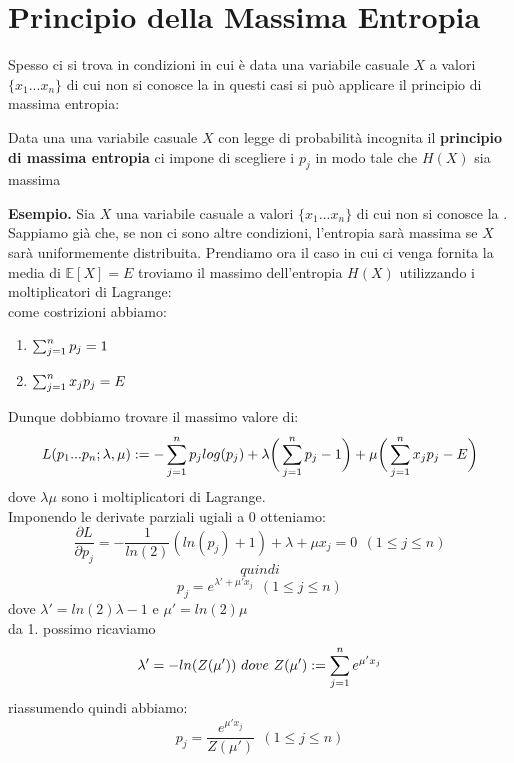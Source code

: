 \section{Principio della Massima Entropia}
\label{sec:maxEntropia}

Spesso ci si trova in condizioni in cui è data una variabile casuale $X$ a valori $\{ x_1...x_n \}$ di cui non si conosce la \lep  in questi casi si può applicare il principio di massima entropia:\\
\begin{defi}
Data una una variabile casuale $X$ con legge di probabilità \lep  incognita il \textbf{principio di massima entropia} ci impone di scegliere i $p_j$ in modo tale che $H(X)$ sia massima
\end{defi}
\textbf{Esempio.} 
Sia $X$ una variabile casuale a valori $\{ x_1...x_n \}$ di cui non si conosce la \lep . Sappiamo già che, se non ci sono altre condizioni, l'entropia sarà massima se $X$ sarà uniformemente distribuita. Prendiamo ora il caso in cui ci venga fornita la media di $\mathbb{E}[ X]=E$ troviamo il massimo dell'entropia $H(X)$ utilizzando i moltiplicatori di Lagrange:\\
come costrizioni abbiamo:
\begin{enumerate}
\item $\sum_{j=1}^n p_j=1$
\item $\sum_{j=1}^n x_j p_j=E$
\end{enumerate}
Dunque dobbiamo trovare il massimo valore di:
\begin{equation}
L(p_1...p_n;\lambda,\mu ):= -\sum_{j=1}^n p_j log(p_j) + \lambda \bigg( \sum_{j=1}^n p_j -1 \bigg) + \mu \bigg( \sum_{j=1}^n x_j p_j - E \bigg)
\end{equation}
dove $\lambda \mu$ sono i moltiplicatori di Lagrange.\\
Imponendo le derivate parziali ugiali a 0 otteniamo:
$$\frac{\partial L}{\partial p_j}=-\frac{1}{ln(2)}(ln(p_j)+1)+\lambda + \mu x_j=0 \ \  (1\leq j \leq n) $$
$$quindi$$
$$p_j=e^{\lambda ' + \mu ' x_j} \ \ (1\leq j \leq n)$$
dove $\lambda ' = ln(2) \lambda -1 $ e $\mu ' = ln(2) \mu$\\
da 1. possimo ricaviamo 
$$\lambda ' = - ln(Z( \mu ')) \ dove \ Z( \mu '):= \sum_{j=1}^n e^{\mu ' x_j}$$
riassumendo quindi abbiamo:
\begin{equation}
p_j=\frac{e^{\mu ' x_j}}{Z( \mu ')} \ \ (1\leq j \leq n)
\end{equation}



